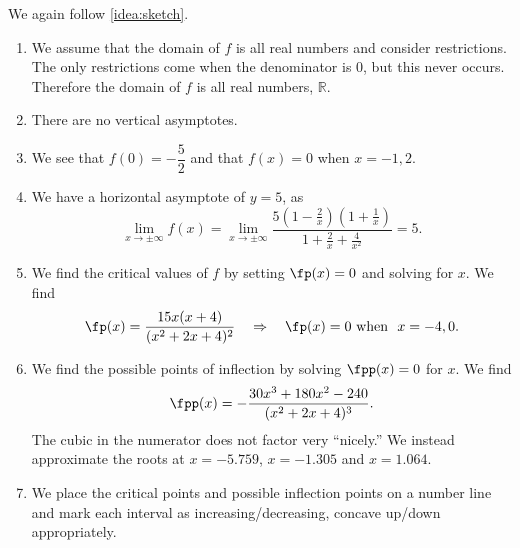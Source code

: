 {We again follow \autoref{idea:sketch}.
	\begin{enumerate}
	\item	We assume that the domain of $f$ is all real numbers and consider restrictions. The only restrictions come when the denominator is 0, but this never occurs. Therefore the domain of $f$ is all real numbers, $\mathbb{R}$.
	\item	There are no vertical asymptotes.
	\item	We see that $f(0)=-\dfrac52$ and that $f(x)=0$ when $x=-1,2$.
	\item	We have a horizontal asymptote of $y=5$, as
	\[\lim_{x\to\pm\infty}f(x)=\lim_{x\to\pm\infty}\frac{5(1-\frac2x)(1+\frac1x)}{1+\frac2x+\frac4{x^2}}=5.\]
	\item	We find the critical values of $f$ by setting $\fp(x)=0$ and solving for $x$. We find 
			$$\fp(x) = \frac{15x(x+4)}{(x^2+2x+4)^2} \quad \Rightarrow \quad \fp(x) = 0 \text{ when } \ x=-4,0.$$
	\item	We find the possible points of inflection by solving $\fpp(x) = 0$ for $x$. We find
			$$\fpp(x) = -\frac{30x^3+180x^2-240}{(x^2+2x+4)^3}.$$ The cubic in the numerator does not factor very ``nicely.'' We instead approximate the roots at $x= -5.759$, $x=-1.305$ and $x=1.064$.
			
	\item	We place the critical points and possible inflection points on a number line and mark each interval as increasing/decreasing, concave up/down appropriately.


\end{enumerate}}
